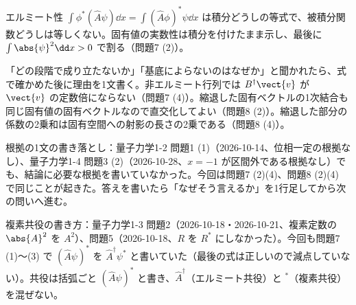 \begin{daiji}
  \item エルミート性 $\int\phi^{*}(\hat{A}\psi)\dd x=\int(\hat{A}\phi)^{*}\psi\dd x$ は積分どうしの等式で、被積分関数どうしは等しくない。固有値の実数性は積分を付けたまま示し、最後に $\int\abs{\psi}^{2}\dd x>0$ で割る（問題7 (2)）。
  \item 「どの段階で成り立たないか」「基底によらないのはなぜか」と聞かれたら、式で確かめた後に理由を1文書く。非エルミート行列では $B^{\dagger}\vect{v}$ が $\vect{v}$ の定数倍にならない（問題7 (4)）。縮退した固有ベクトルの1次結合も同じ固有値の固有ベクトルなので直交化してよい（問題8 (2)）。縮退した部分の係数の2乗和は固有空間への射影の長さの2乗である（問題8 (4)）。
\end{daiji}
\begin{maemo}
  \item 根拠の1文の書き落とし：量子力学1-2 問題1 (1)（2026-10-14、位相一定の根拠なし）、量子力学1-4 問題3 (2)（2026-10-28、$x=-1$ が区間外である根拠なし）でも、結論に必要な根拠を書いていなかった。今回は問題7 (2)(4)、問題8 (2)(4) で同じことが起きた。答えを書いたら「なぜそう言えるか」を1行足してから次の問いへ進む。
  \item 複素共役の書き方：量子力学1-3 問題2（2026-10-18・2026-10-21、複素定数の $\abs{A}^{2}$ を $A^{2}$）、問題5（2026-10-18、$R$ を $R^{*}$ にしなかった）。今回も問題7 (1)〜(3) で $(\hat{A}\psi)^{*}$ を $\hat{A}^{\dagger}\psi^{*}$ と書いていた（最後の式は正しいので減点していない）。共役は括弧ごと $(\hat{A}\psi)^{*}$ と書き、$\hat{A}^{\dagger}$（エルミート共役）と $^{*}$（複素共役）を混ぜない。
\end{maemo}
